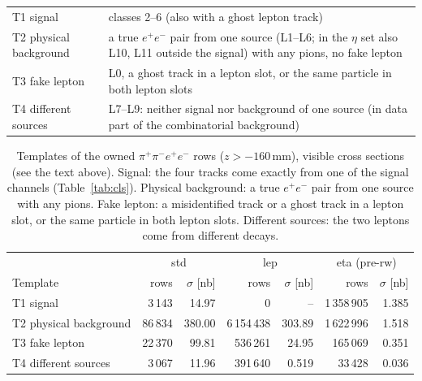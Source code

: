 \documentclass[11pt,a4paper]{article}
\newcommand{\ee}{\ensuremath{e^{+}e^{-}}\xspace}
\newcommand{\ppee}{\ensuremath{\pi^{+}\pi^{-}e^{+}e^{-}}\xspace}
\begin{document}
\begin{table}[H]
\begin{tabularx}{\textwidth}{@{}l L@{}}
T1 signal & classes 2--6 (also with a ghost lepton track) \\
T2 physical background & a true \ee pair from one source (L1--L6; in the $\eta$ set also L10, L11 outside the
   signal) with any pions, no fake lepton \\
T3 fake lepton & L0, a ghost track in a lepton slot, or the same particle in both lepton slots \\
T4 different sources & L7--L9: neither signal nor background of one source (in data part of the
   combinatorial background) \\
\bottomrule
\end{tabularx}
\end{table}

\begin{table}[H]
\centering
\caption{Templates of the owned \ppee rows ($z>-160$\,mm), visible cross sections (see the text
above). Signal: the four tracks come exactly from one of the signal channels
(Table~\ref{tab:cls}). Physical background: a true \ee pair from one source with any pions. Fake
lepton: a misidentified track or a ghost track in a lepton slot, or the same particle in both
lepton slots. Different sources: the two leptons come from different decays.}
\label{tab:tmpl}
\begin{tabular}{@{}l rr rr rr@{}}
\toprule
 & \multicolumn{2}{c}{std} & \multicolumn{2}{c}{lep} & \multicolumn{2}{c}{eta (pre-rw)} \\
Template & rows & $\sigma$ [nb] & rows & $\sigma$ [nb] & rows & $\sigma$ [nb] \\
\midrule
T1 signal              &  3\,143 & 14.97 &           0 & --     & 1\,358\,905 & 1.385 \\
T2 physical background & 86\,834 & 380.00 & 6\,154\,438 & 303.89 &  1\,622\,996 & 1.518 \\
T3 fake lepton         & 22\,370 & 99.81 &    536\,261 & 24.95 &    165\,069 & 0.351 \\
T4 different sources   &  3\,067 & 11.96 &    391\,640 & 0.519 &     33\,428 & 0.036 \\
\bottomrule
\end{tabular}
\end{table}
\end{document}

